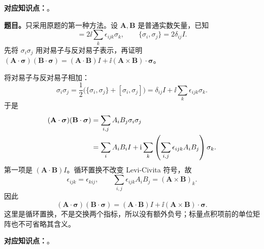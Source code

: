 \textbf{对应知识点：}。

\textbf{题目。}只采用原题的第一种方法。设 $\mathbf A,\mathbf B$ 是普通实数矢量，已知
\begin{equation}
  [\sigma_i,\sigma_j]=2\ii\sum_k\epsilon_{ijk}\sigma_k,
  \qquad \{\sigma_i,\sigma_j\}=2\delta_{ij}I.
\end{equation}
先将 $\sigma_i\sigma_j$ 用对易子与反对易子表示，再证明
$(\mathbf A\cdot\boldsymbol\sigma)(\mathbf B\cdot\boldsymbol\sigma)
=(\mathbf A\cdot\mathbf B)I+\ii(\mathbf A\times\mathbf B)\cdot\boldsymbol\sigma$。

\begin{checkedsolution}
将对易子与反对易子相加：
\begin{equation}
  \sigma_i\sigma_j=\frac12\bigl(\{\sigma_i,\sigma_j\}+[\sigma_i,\sigma_j]\bigr)
    =\delta_{ij}I+\ii\sum_k\epsilon_{ijk}\sigma_k.
\end{equation}
于是
\begin{align}
  (\mathbf A\cdot\boldsymbol\sigma)(\mathbf B\cdot\boldsymbol\sigma)
    &=\sum_{i,j}A_iB_j\sigma_i\sigma_j\notag\\
    &=\sum_iA_iB_iI
       +\mathrm{i}\sum_k\left(\sum_{i,j}\epsilon_{ijk}A_iB_j\right)\sigma_k.
\end{align}
第一项是 $(\mathbf A\cdot\mathbf B)I$。循环置换不改变 Levi-Civita 符号，故
\begin{equation}
  \epsilon_{ijk}=\epsilon_{kij},\qquad
  \sum_{i,j}\epsilon_{ijk}A_iB_j=(\mathbf A\times\mathbf B)_k.
\end{equation}
因此
\begin{equation}
  \boxed{(\mathbf A\cdot\boldsymbol\sigma)(\mathbf B\cdot\boldsymbol\sigma)
    =(\mathbf A\cdot\mathbf B)I
     +\ii(\mathbf A\times\mathbf B)\cdot\boldsymbol\sigma.}
\end{equation}
这里是循环置换，不是交换两个指标，所以没有额外负号；标量点积项前的单位矩阵也不可省略其含义。
\end{checkedsolution}

\textbf{对应知识点：}。

